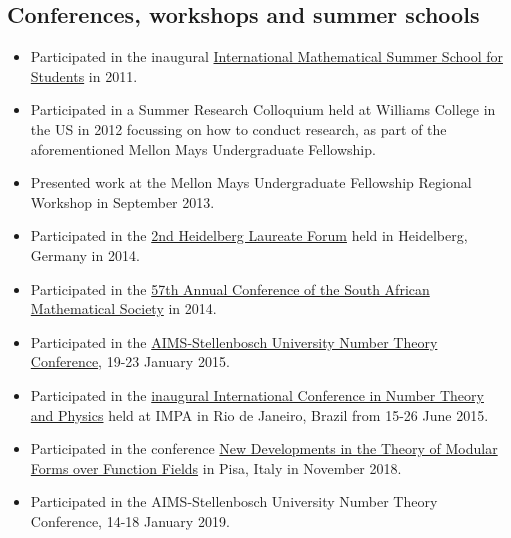 \documentclass{article}
\begin{document}
\subsection{Conferences, workshops and summer schools}
\begin{itemize}
	\item Participated in the inaugural \href{http://math.jacobs-university.de/summerschool/2011}{International Mathematical Summer School for Students} in 2011.
	\item Participated in a Summer Research Colloquium held at Williams College in the US in 2012 focussing on how to conduct research, as part of the aforementioned Mellon Mays Undergraduate Fellowship.
	\item Presented work at the Mellon Mays Undergraduate Fellowship Regional Workshop in September 2013.
	\item Participated in the \href{http://www.heidelberg-laureate-forum.org/event_2014/}{2nd Heidelberg Laureate Forum} held in Heidelberg, Germany in 2014.
	\item Participated in the \href{http://www.unisa.ac.za/Default.asp?Cmd=ViewContent&ContentID=96795}{57th Annual Conference of the South African Mathematical Society} in 2014.
	\item Participated in the \href{http://www.aims.ac.za/en/research-centre/workshops-conferences/past/aims-stellenbosch-university-number-theory-conference-19-23-january-2015}{AIMS-Stellenbosch University Number Theory Conference}, 19-23 January 2015.
	\item Participated in the \href{http://www.impa.br/opencms/pt/eventos/store/evento_1504}{inaugural International Conference in Number Theory and Physics} held at IMPA in Rio de Janeiro, Brazil from 15-26 June 2015.
	\item Participated in the conference \href{https://dmvpisa2018.wordpress.com/}{New Developments in the Theory of Modular Forms over Function Fields} in Pisa, Italy in November 2018.
	\item Participated in the AIMS-Stellenbosch University Number Theory Conference, 14-18 January 2019.
\end{itemize}
\end{document}

